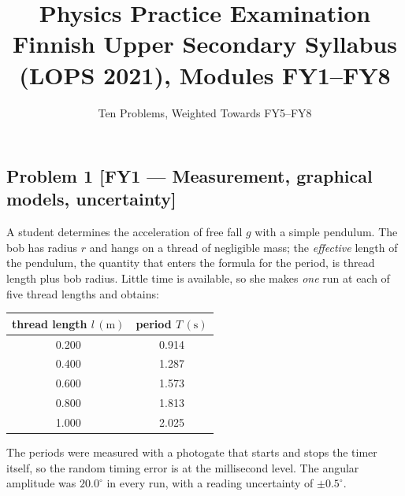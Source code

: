 \documentclass[11pt,a4paper]{article}
\title{\vspace{-1.4cm}\bfseries Physics Practice Examination\\[2pt]
\large Finnish Upper Secondary Syllabus (LOPS 2021), Modules FY1--FY8}
\author{Ten Problems, Weighted Towards FY5--FY8}
\date{}
\newcommand{\problem}[3]{%
  \subsection*{Problem #1 \;\textnormal{\small[#2]}}\label{prob:#3}%
}
\newcommand{\unit}[1]{\,\mathrm{#1}}
\begin{document}
\maketitle
\vspace{-1.6em}

\begin{center}
\end{center}

\problem{1}{FY1 --- Measurement, graphical models, uncertainty}{fy1}

A student determines the acceleration of free fall $g$ with a simple pendulum.
The bob has radius $r$ and hangs on a thread of negligible mass; the
\emph{effective} length of the pendulum, the quantity that enters the formula
for the period, is thread length plus bob radius. Little time is available, so
she makes \emph{one} run at each of five thread lengths and obtains:

\begin{center}
\begin{tabular}{cc}
\toprule
thread length $l\unit{(m)}$ & period $T\unit{(s)}$\\
\midrule
0.200 & 0.914\\
0.400 & 1.287\\
0.600 & 1.573\\
0.800 & 1.813\\
1.000 & 2.025\\
\bottomrule
\end{tabular}
\end{center}

The periods were measured with a photogate that starts and stops the timer
itself, so the random timing error is at the millisecond level. The angular
amplitude was $20.0^\circ$ in every run, with a reading uncertainty of
$\pm0.5^\circ$.
\end{document}
